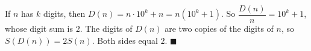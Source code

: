 If $n$ has $k$ digits, then $D(n)=n\cdot10^k+n=n(10^k+1)$. So $\dfrac{D(n)}n=10^k+1$, whose digit sum is $2$. The digits of $D(n)$ are two copies of the digits of $n$, so $S(D(n))=2S(n)$. Both sides equal $2$. $\blacksquare$

